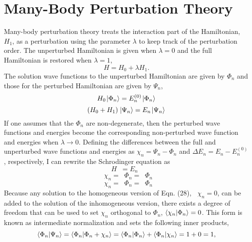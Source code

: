 \documentclass[thesis.tex]{subfiles}
\begin{document}
\section{Many-Body Perturbation Theory}
Many-body perturbation theory treats the interaction part of the Hamiltonian, $H_{1}$, as a perturbation using the parameter $\lambda$ to keep track of the perturbation order. The unperturbed Hamiltonian is given when $\lambda=0$ and the full Hamiltonian is restored when $\lambda=1$,
\begin{equation}
H=H_{0}+\lambda H_{1}.
\end{equation}
The solution wave functions to the unperturbed Hamiltonian are given by $\Phi_{n}$ and those for the perturbed Hamiltonian are given by $\Psi_{n}$,
\begin{equation}
H_{0}\hspace{1pt}| \Phi_{n} \rangle=E^{(0)}_{n}\hspace{1pt}| \Phi_{n} \rangle
\end{equation}
\begin{equation}
\mathop{(H_{0}+H_{1})}\hspace{1pt}| \Psi_{n} \rangle=E_{n}\hspace{1pt}| \Psi_{n} \rangle
\end{equation}
If one assumes that the $\Phi_{n}$ are non-degenerate, then the perturbed wave functions and energies become the corresponding non-perturbed wave function and energies when $\lambda\rightarrow 0$. Defining the differences between the full and unperturbed wave functions and energies as $\chi_{n}=\Psi_{n}-\Phi_{n}$ and $\Delta E_{n}=E_{n}-E^{(0)}_{n}$, respectively, I can rewrite the Schrodinger equation as
\begin{equation}
H\mathop{(\Phi_{n}+\chi_{n})}=E_{n}\mathop{(\Phi_{n}+\chi_{n})}
\end{equation}
\begin{equation}
\mathop{(H-E_{n})}\chi_{n}=\mathop{(E_{n}-H)}\Phi_{n}=\mathop{(E_{n}-H_{0}-H_{1})}\Phi_{n}
\end{equation}
\begin{equation}
\mathop{(H-E_{n})}\chi_{n}=\mathop{(E_{n}-E^{(0)}_{n}-H_{1})}\Phi_{n}=\mathop{(\Delta E_{n}-H_{1})}\Phi_{n}
\end{equation}
Because any solution to the homogeneous version of Eqn. (28), $\mathop{(H-E_{n})}\chi_{n}=0$, can be added to the solution of the inhomogeneous version, there exists a degree of freedom that can be used to set $\chi_{n}$ orthogonal to $\Phi_{n}$, $\langle \chi_{n} | \Phi_{n}\rangle=0$. This form is known as intermediate normalization and sets the following inner products,
\begin{equation}
\langle \Phi_{n} | \Psi_{n}\rangle=\langle \Phi_{n} | \Phi_{n}+\chi_{n}\rangle=\langle \Phi_{n} | \Phi_{n}\rangle+\langle \Phi_{n} | \chi_{n}\rangle=1+0=1,
\end{equation}
\end{document}
